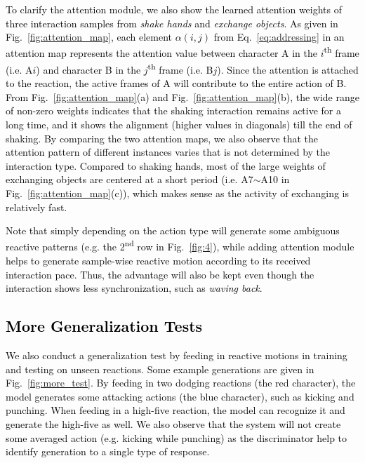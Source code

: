\documentclass[times,twocolumn,final]{elsarticle}
\begin{document}
\textcolor{black}{To clarify the attention module, we also show the learned attention weights of three interaction samples from \textit{shake hands} and \textit{exchange objects}. As given in Fig.~\ref{fig:attention_map}, each element $\alpha(i,j)$ from Eq.~\ref{eq:addressing} in an attention map represents the attention value between character A in the $i$\textsuperscript{th} frame (i.e. A$i$) and character B in the $j$\textsuperscript{th} frame (i.e. B$j$). Since the attention is attached to the reaction, the active frames of A will contribute to the entire action of B. From Fig.~\ref{fig:attention_map}(a) and Fig.~\ref{fig:attention_map}(b), the wide range of non-zero weights indicates that the shaking interaction remains active for a long time, and it shows the alignment (higher values in diagonals) till the end of shaking. By comparing the two attention maps, we also observe that the attention pattern of different instances varies that is not determined by the interaction type. Compared to shaking hands, most of the large weights of exchanging objects are centered at a short period (i.e. A7$\sim$A10 in Fig.~\ref{fig:attention_map}(c)), which makes sense as the activity of exchanging is relatively fast.}

\textcolor{black}{Note that simply depending on the action type will generate some ambiguous reactive patterns (e.g. the 2\textsuperscript{nd} row in Fig.~\ref{fig:4}), while adding attention module helps to generate sample-wise reactive motion according to its received interaction pace. Thus, the advantage will also be kept even though the interaction shows less synchronization, such as \textit{waving back}.}


\subsection{\textcolor{black}{More Generalization Tests}}
\textcolor{black}{%
We also conduct a generalization test by feeding in reactive motions in training and testing on unseen reactions. Some example generations are given in Fig.~\ref{fig:more_test}. By feeding in two dodging reactions (the red character), the model generates some attacking actions (the blue character), such as kicking and punching. When feeding in a high-five reaction, the model can recognize it and generate the high-five as well. We also observe that the system will not create some averaged action (e.g. kicking while punching) as the discriminator help to identify generation to a single type of response.}
\end{document}
